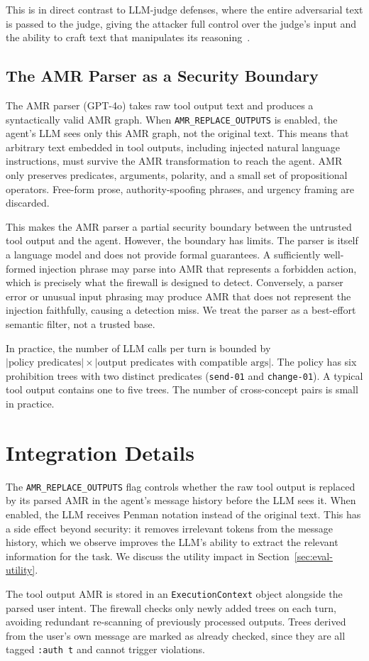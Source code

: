 This is in direct contrast to LLM-judge defenses, where the entire adversarial text is
passed to the judge, giving the attacker full control over the judge's input and the
ability to craft text that manipulates its reasoning~\cite{shi2024judgedeceiver}.

\subsection{The AMR Parser as a Security Boundary}

The AMR parser (GPT-4o) takes raw tool output text and produces a syntactically valid
AMR graph.
When \texttt{AMR\_REPLACE\_OUTPUTS} is enabled, the agent's LLM sees only this AMR
graph, not the original text.
This means that arbitrary text embedded in tool outputs, including injected natural
language instructions, must survive the AMR transformation to reach the agent.
AMR only preserves predicates, arguments, polarity, and a small set of propositional
operators.
Free-form prose, authority-spoofing phrases, and urgency framing are discarded.

This makes the AMR parser a partial security boundary between the untrusted tool
output and the agent.
However, the boundary has limits.
The parser is itself a language model and does not provide formal guarantees.
A sufficiently well-formed injection phrase may parse into AMR that represents a
forbidden action, which is precisely what the firewall is designed to detect.
Conversely, a parser error or unusual input phrasing may produce AMR that does not
represent the injection faithfully, causing a detection miss.
We treat the parser as a best-effort semantic filter, not a trusted base.

In practice, the number of LLM calls per turn is bounded by
$|\text{policy predicates}| \times |\text{output predicates with compatible args}|$.
The policy has six prohibition trees with two distinct predicates (\texttt{send-01} and
\texttt{change-01}).
A typical tool output contains one to five trees.
The number of cross-concept pairs is small in practice.

\section{Integration Details}
\label{sec:sys-integration}

The \texttt{AMR\_REPLACE\_OUTPUTS} flag controls whether the raw tool output is replaced
by its parsed AMR in the agent's message history before the LLM sees it.
When enabled, the LLM receives Penman notation instead of the original text.
This has a side effect beyond security: it removes irrelevant tokens from the message
history, which we observe improves the LLM's ability to extract the relevant information
for the task.
We discuss the utility impact in Section~\ref{sec:eval-utility}.

The tool output AMR is stored in an \texttt{ExecutionContext} object alongside the
parsed user intent.
The firewall checks only newly added trees on each turn, avoiding redundant re-scanning
of previously processed outputs.
Trees derived from the user's own message are marked as already checked, since they are
all tagged \texttt{:auth t} and cannot trigger violations.
